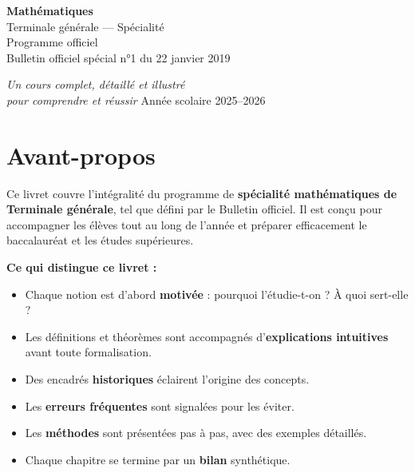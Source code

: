 \documentclass[12pt,a4paper,twoside]{book}
\newcommand{\binom}[2]{\displaystyle\binom{#1}{#2}}
\begin{document}
\begin{titlepage}
\centering
\vspace*{3cm}
{\sffamily\Huge\bfseries\color{indigo} Mathématiques\\[0.3cm]}
{\sffamily\LARGE\color{indigo!80!black} Terminale générale — Spécialité\\[1.5cm]}
{\large\color{gray} Programme officiel\\Bulletin officiel spécial n°1 du 22 janvier 2019\\[2cm]}


\vspace{2cm}
{\large\itshape Un cours complet, détaillé et illustré\\pour comprendre et réussir}
\vfill
{\small\color{gray} Année scolaire 2025–2026}
\end{titlepage}

\tableofcontents
\newpage

\chapter*{Avant-propos}

Ce livret couvre l'intégralité du programme de \textbf{spécialité mathématiques de Terminale générale}, tel que défini par le Bulletin officiel. Il est conçu pour accompagner les élèves tout au long de l'année et préparer efficacement le baccalauréat et les études supérieures.

\medskip

\textbf{Ce qui distingue ce livret :}
\begin{itemize}[leftmargin=*]
  \item Chaque notion est d'abord \textbf{motivée} : pourquoi l'étudie-t-on ? À quoi sert-elle ?
  \item Les définitions et théorèmes sont accompagnés d'\textbf{explications intuitives} avant toute formalisation.
  \item Des encadrés \textbf{historiques} éclairent l'origine des concepts.
  \item Les \textbf{erreurs fréquentes} sont signalées pour les éviter.
  \item Les \textbf{méthodes} sont présentées pas à pas, avec des exemples détaillés.
  \item Chaque chapitre se termine par un \textbf{bilan} synthétique.
\end{itemize}
\end{document}
